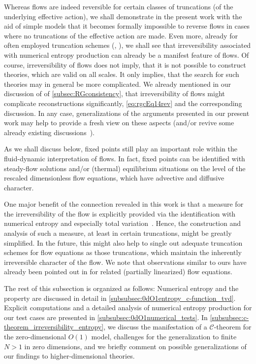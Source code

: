 Whereas \frg{} flows are indeed reversible for certain classes of truncations (of the underlying effective action), we shall demonstrate in the present work \dash{} with the aid of simple models \dash{} that it becomes formally impossible to reverse \frg{} flows in cases where no truncations of the effective action are made.
Even more, already for often employed truncation schemes (\eg{}, \lpa{}), we shall see that irreversibility associated with numerical entropy production can already be a manifest feature of \frg{} flows.
Of course, irreversibility of \frg{} flows does not imply, that it is not possible to construct theories, which are valid on all scales.
It only implies, that the search for such theories may in general be more complicated.
We already mentioned in our discussion of \rgcy{} of \cref{subsec:RGconsistency}, that irreversibility of \grg{} flows might complicate \rgct{} reconstructions significantly, \cf{} \cref{eq:rgcEq14rev} and the corresponding discussion.
In any case, generalizations of the arguments presented in our present work may help to provide a fresh view on these aspects (and/or revive some already existing discussions~\cite{Zamolodchikov:1986gt,Zumbach:1993zz,Zumbach:1994kc,Zumbach:1994vg,Rosten:2010vm,Felder:1987,Hasenfratz:1985dm}).

As we shall discuss below, fixed points still play an important role within the fluid-dynamic interpretation of \frg{} flows.
In fact, fixed points can be identified with steady-flow solutions and/or (thermal) equilibrium situations on the level of the rescaled dimensionless flow equations, which have advective and diffusive character.

One major benefit of the connection revealed in this work is that a measure for the irreversibility of the \frg{} flow is explicitly provided via the identification with numerical entropy and especially total variation~\cite{LeVeque:1992,LeVeque:2002,RezzollaZanotti:2013,KTO2-0,HARTEN1983357}.
Hence, the construction and analysis of such a measure, at least in certain truncations, might be greatly simplified.
In the future, this might also help to single out adequate truncation schemes for \frg{} flow equations as those truncations, which maintain the inherently irreversible character of the flow.
We note that observations similar to ours have already been pointed out in  for related (partially linearized) flow equations.

The rest of this subsection is organized as follows: Numerical entropy and the \tvni{} property are discussed in detail in \cref{subsubsec:0dO1entropy_c-function_tvd}.
Explicit computations and a detailed analysis of numerical entropy production for our test cases are presented in \cref{subsubsec:0dO1numerical_tests}.
In \cref{subsubsec:c-theorem_irreversibility_entropy}, we discuss the manifestation of a \texorpdfstring{$\mathcal{C}$}{C}-theorem for the zero-dimensional $O(1)$ model, challenges for the generalization to finite $N>1$ in zero dimensions, and we briefly comment on possible generalizations of our findings to higher-dimensional theories.


